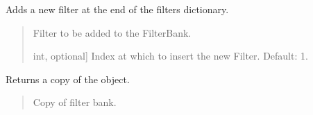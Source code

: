 \documentclass[letterpaper,10pt,english]{sphinxmanual}
\begin{document}
\begin{fulllineitems}
\begin{fulllineitems}
\label{\detokenize{classes:dsptoolbox.classes.filterbank.FilterBank.add_filter}}
\pysigstartsignatures
{}
\pysigstopsignatures
\sphinxAtStartPar
Adds a new filter at the end of the filters dictionary.
\begin{quote}\begin{description}
\begin{description}
\sphinxlineitem{\sphinxstylestrong{filt}}{[}\sphinxtitleref{Filter}{]}
\sphinxAtStartPar
Filter to be added to the FilterBank.

\sphinxlineitem{\sphinxstylestrong{index}}{[}int, optional{]}
\sphinxAtStartPar
Index at which to insert the new Filter. Default: \sphinxhyphen{}1.

\end{description}

\end{description}\end{quote}

\end{fulllineitems}


\begin{fulllineitems}
\label{\detokenize{classes:dsptoolbox.classes.filterbank.FilterBank.copy}}
\pysigstartsignatures
{}
\pysigstopsignatures
\sphinxAtStartPar
Returns a copy of the object.
\begin{quote}\begin{description}
\begin{description}
\sphinxlineitem{\sphinxstylestrong{new\_sig}}{[}\sphinxtitleref{FilterBank}{]}
\sphinxAtStartPar
Copy of filter bank.

\end{description}

\end{description}\end{quote}


\end{fulllineitems}
\end{fulllineitems}
\end{document}

